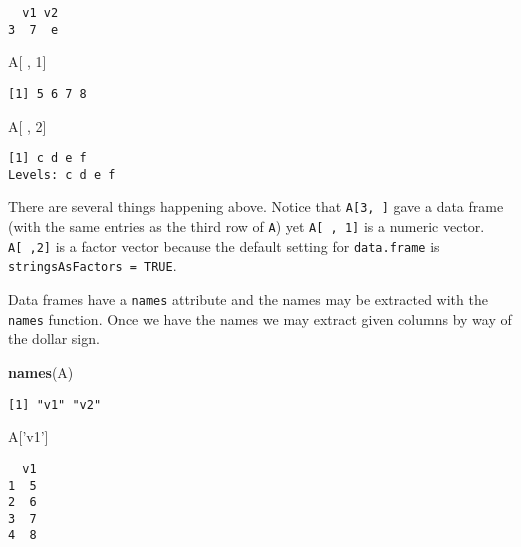 \documentclass[]{book}
\newenvironment{Shaded}{\begin{snugshade}}{\end{snugshade}}
\newcommand{\KeywordTok}[1]{\textcolor[rgb]{0.13,0.29,0.53}{\textbf{{#1}}}}
\newcommand{\DecValTok}[1]{\textcolor[rgb]{0.00,0.00,0.81}{{#1}}}
\newcommand{\StringTok}[1]{\textcolor[rgb]{0.31,0.60,0.02}{{#1}}}
\newcommand{\NormalTok}[1]{{#1}}
\numberwithin{equation}{chapter}
\numberwithin{figure}{chapter}
\theoremstyle{plain}
\theoremstyle{definition}
\theoremstyle{remark}
\theoremstyle{definition}
\theoremstyle{definition}
\theoremstyle{remark}
\begin{document}
\begin{verbatim}
  v1 v2
3  7  e
\end{verbatim}

\begin{Shaded}
\begin{Highlighting}[]
\NormalTok{A[ , }\DecValTok{1}\NormalTok{]}
\end{Highlighting}
\end{Shaded}

\begin{verbatim}
[1] 5 6 7 8
\end{verbatim}

\begin{Shaded}
\begin{Highlighting}[]
\NormalTok{A[ , }\DecValTok{2}\NormalTok{]}
\end{Highlighting}
\end{Shaded}

\begin{verbatim}
[1] c d e f
Levels: c d e f
\end{verbatim}

There are several things happening above. Notice that
\texttt{A{[}3,\ {]}} gave a data frame (with the same entries as the
third row of \texttt{A}) yet \texttt{A{[}\ ,\ 1{]}} is a numeric vector.
\texttt{A{[}\ ,2{]}} is a factor vector because the default setting for
\texttt{data.frame} is \texttt{stringsAsFactors\ =\ TRUE}.

Data frames have a \texttt{names} attribute and the names may be
extracted with the \texttt{names} function. Once we have the names we
may extract given columns by way of the dollar sign.

\begin{Shaded}
\begin{Highlighting}[]
\KeywordTok{names}\NormalTok{(A)}
\end{Highlighting}
\end{Shaded}

\begin{verbatim}
[1] "v1" "v2"
\end{verbatim}

\begin{Shaded}
\begin{Highlighting}[]
\NormalTok{A[}\StringTok{'v1'}\NormalTok{]}
\end{Highlighting}
\end{Shaded}

\begin{verbatim}
  v1
1  5
2  6
3  7
4  8
\end{verbatim}
\end{document}
